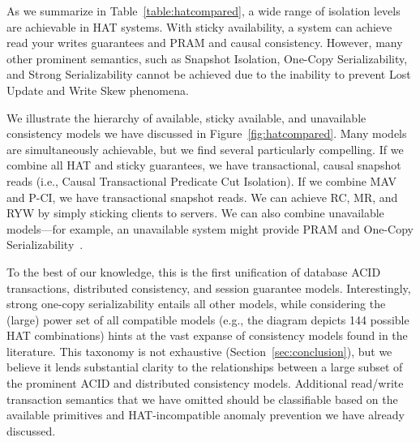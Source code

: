 {As we summarize in Table~\ref{table:hatcompared}, a wide range of
isolation levels are achievable in HAT systems. With sticky
availability, a system can achieve read your writes guarantees and
PRAM and causal consistency. However, many other prominent semantics,
such as Snapshot Isolation, One-Copy Serializability, and Strong
Serializability cannot be achieved due to the inability to prevent
Lost Update and Write Skew phenomena.

We illustrate the hierarchy of available, sticky available, and
unavailable consistency models we have discussed in
Figure~\ref{fig:hatcompared}. Many models are simultaneously
achievable, but we find several particularly compelling. If we combine
all HAT and sticky guarantees, we have transactional, causal snapshot
reads (i.e., Causal Transactional Predicate Cut Isolation). If we
combine MAV and P-CI, we have transactional snapshot reads. We can
achieve RC, MR, and RYW by simply sticking clients to servers. We can
also combine unavailable models---for example, an unavailable system
might provide PRAM and One-Copy
Serializability~\cite{daudjee-session}.

To the best of our knowledge, this is the first unification of
database ACID transactions, distributed consistency, and session
guarantee models. Interestingly, strong one-copy serializability
entails all other models, while considering the (large) power set of
all compatible models (e.g., the diagram depicts 144 possible HAT
combinations) hints at the vast expanse of consistency models found in
the literature. This taxonomy is not exhaustive
(Section~\ref{sec:conclusion}), but we believe it lends substantial
clarity to the relationships between a large subset of the prominent
ACID and distributed consistency models. Additional read/write
transaction semantics that we have omitted should be classifiable
based on the available primitives and HAT-incompatible anomaly
prevention we have already discussed.

}
